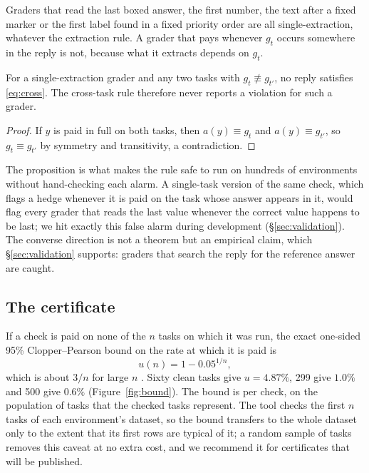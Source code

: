 Graders that read the last boxed answer, the first number, the text after a fixed marker or the first label found in a fixed priority order are all single-extraction, whatever the extraction rule. A grader that pays whenever $g_t$ occurs somewhere in the reply is not, because what it extracts depends on $g_t$.

\begin{proposition}
\label{prop:single}
For a single-extraction grader and any two tasks with $g_t \not\equiv g_{t'}$, no reply satisfies \eqref{eq:cross}. The cross-task rule therefore never reports a violation for such a grader.
\end{proposition}

\begin{proof}
If $y$ is paid in full on both tasks, then $a(y) \equiv g_t$ and $a(y) \equiv g_{t'}$, so $g_t \equiv g_{t'}$ by symmetry and transitivity, a contradiction.
\end{proof}

The proposition is what makes the rule safe to run on hundreds of environments without hand-checking each alarm. A single-task version of the same check, which flags a hedge whenever it is paid on the task whose answer appears in it, would flag every grader that reads the last value whenever the correct value happens to be last; we hit exactly this false alarm during development (\S\ref{sec:validation}). The converse direction is not a theorem but an empirical claim, which \S\ref{sec:validation} supports: graders that search the reply for the reference answer are caught.

\subsection{The certificate}
\label{sec:certificate}

If a check is paid on none of the $n$ tasks on which it was run, the exact one-sided 95\% Clopper--Pearson bound \citep{clopper1934} on the rate at which it is paid is
\begin{equation}
u(n) = 1 - 0.05^{1/n},
\end{equation}
which is about $3/n$ for large $n$ \citep{hanley1983}. Sixty clean tasks give $u = 4.87\%$, 299 give $1.0\%$ and 500 give $0.6\%$ (Figure~\ref{fig:bound}). The bound is per check, on the population of tasks that the checked tasks represent. The tool checks the first $n$ tasks of each environment's dataset, so the bound transfers to the whole dataset only to the extent that its first rows are typical of it; a random sample of tasks removes this caveat at no extra cost, and we recommend it for certificates that will be published.

